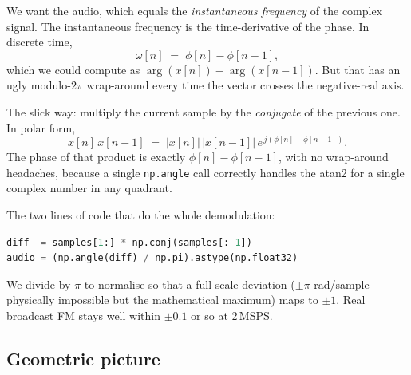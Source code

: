 \documentclass[11pt,a4paper]{article}
\begin{document}
We want the audio, which equals the \emph{instantaneous frequency} of
the complex signal.  The instantaneous frequency is the time-derivative
of the phase.  In discrete time,
\begin{equation}
\omega[n] \;=\; \phi[n] - \phi[n{-}1],
\end{equation}
which we could compute as
\(\arg(x[n]) - \arg(x[n{-}1])\).  But that has an ugly modulo-\(2\pi\)
wrap-around every time the vector crosses the negative-real axis.

The slick way: multiply the current sample by the \emph{conjugate} of
the previous one.  In polar form,
\begin{equation}
x[n]\,\overline{x}[n{-}1]
\;=\; |x[n]|\,|x[n{-}1]|\,e^{\,j(\phi[n]-\phi[n{-}1])}.
\end{equation}
The phase of that product is exactly \(\phi[n]-\phi[n{-}1]\), with no
wrap-around headaches, because a single \texttt{np.angle} call
correctly handles the atan2 for a single complex number in any quadrant.

The two lines of code that do the whole demodulation:

\begin{lstlisting}[language=Python]
diff  = samples[1:] * np.conj(samples[:-1])
audio = (np.angle(diff) / np.pi).astype(np.float32)
\end{lstlisting}

We divide by \(\pi\) to normalise so that a full-scale deviation
(\(\pm\pi\) rad/sample -- physically impossible but the mathematical
maximum) maps to \(\pm 1\).  Real broadcast FM stays well within
\(\pm 0.1\) or so at 2\,MSPS.

\subsection{Geometric picture}

\begin{center}
\end{center}
\end{document}
